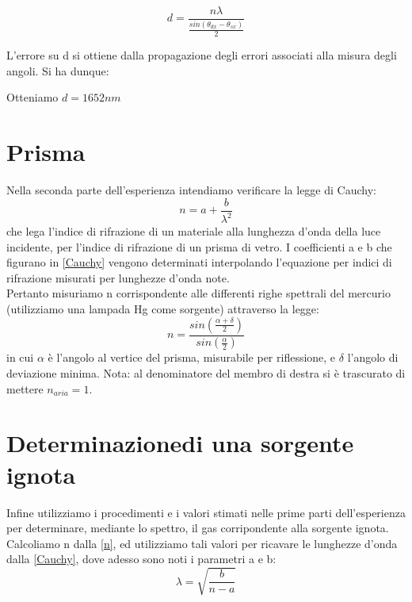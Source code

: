 \begin{equation}
d = \frac{n \lambda}{\frac{sin(\theta_{dx}-\theta_{sx})}{2}}
\end{equation}

L'errore su d si ottiene dalla propagazione degli errori associati alla misura degli angoli. Si ha dunque:


Otteniamo $ d = 1652 nm $




\section*{Prisma}

Nella seconda parte dell'esperienza intendiamo verificare la legge di Cauchy:
\begin{equation}
n = a + \frac{b}{\lambda^2}
\label{Cauchy}
\end{equation}
che lega l'indice di rifrazione di un materiale alla lunghezza d'onda della luce incidente, per l'indice di rifrazione di un prisma di vetro.
I coefficienti a e b che figurano in \ref{Cauchy} vengono determinati interpolando l'equazione per indici di rifrazione misurati per lunghezze d'onda note. \\
Pertanto misuriamo n corrispondente alle differenti righe spettrali del mercurio (utilizziamo una lampada Hg come sorgente) attraverso la legge:
\begin{equation}
n = \frac{sin(\frac{\alpha + \delta}{2})}{sin(\frac{\alpha}{2})}
\label{n}
\end{equation}
in cui $\alpha$ è l'angolo al vertice del prisma, misurabile per riflessione, e $\delta$ l'angolo di deviazione minima. Nota: al denominatore del membro di destra si è trascurato di mettere $n_{aria}=1$.

\section*{Determinazionedi una sorgente ignota}
Infine utilizziamo i procedimenti e i valori stimati nelle prime parti dell'esperienza  per determinare, mediante lo spettro, il gas corripondente alla sorgente ignota.\\

Calcoliamo n dalla \ref{n}, ed utilizziamo tali valori per ricavare le lunghezze d'onda dalla \ref{Cauchy}, dove adesso sono noti i parametri a e b:
\begin{equation}
\lambda = \sqrt{\frac{b}{n-a}}
\end{equation}


